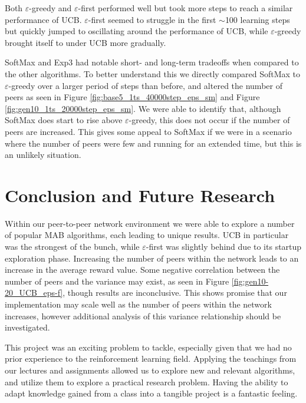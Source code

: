 \documentclass{article}
\begin{document}
Both $\varepsilon$-greedy and $\varepsilon$-first performed well but took more steps to reach a similar performance of UCB. $\varepsilon$-first seemed to struggle in the 
first $\sim$100 learning steps but quickly jumped to oscillating around the performance of UCB, while $\varepsilon$-greedy brought itself to under UCB more gradually. 

SoftMax and Exp3 had notable short- and long-term tradeoffs when compared to the other algorithms. To better understand this we directly compared SoftMax to 
$\varepsilon$-greedy over a larger period of steps than before, and altered the number of peers as seen in Figure \ref{fig:base5_1ts_40000step_eps_sm} and 
Figure \ref{fig:gen10_1ts_20000step_eps_sm}. We were able to identify that, although SoftMax does start to rise above $\varepsilon$-greedy, this does not occur if the number 
of peers are increased. This gives some appeal to SoftMax if we were in a scenario where the number of peers were few and running for an extended time, but this 
is an unlikely situation. 

\section{Conclusion and Future Research}

Within our peer-to-peer network environment we were able to explore a number of popular MAB algorithms, each leading to unique results. UCB in particular was the strongest 
of the bunch, while $\varepsilon$-first was slightly behind due to its startup exploration phase. Increasing the number of peers within the network leads to an increase in 
the average reward value. Some negative correlation between the number of peers and the variance may exist, as seen in Figure \ref{fig:gen10-20_UCB_eps-f}, though results 
are inconclusive. This shows promise that our implementation may scale well as the number of peers within the network increases, however additional analysis of this 
variance relationship should be investigated. 

This project was an exciting problem to tackle, especially given that we had no prior experience to the reinforcement learning field. Applying the teachings from our 
lectures and assignments allowed us to explore new and relevant algorithms, and utilize them to explore a practical research problem. Having the ability to adapt knowledge 
gained from a class into a tangible project is a fantastic feeling. 
\end{document}
